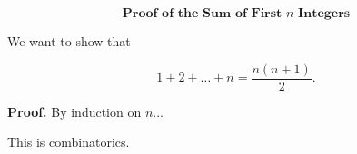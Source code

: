 $$
\textbf{Proof of the Sum of First $n$ Integers}
$$

We want to show that

\[
1 + 2 + \dots + n = \frac{n(n+1)}{2}.
\]

\textbf{Proof.}
By induction on $n$...

This is combinatorics.